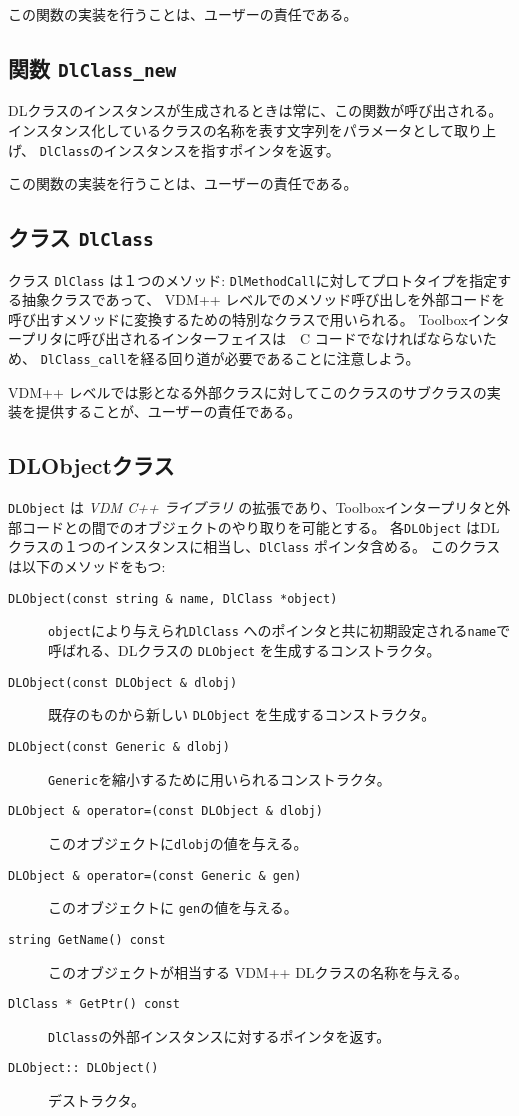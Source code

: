 \documentclass[\pformat,12pt]{jarticle}
\newcommand{\vdmcpplib}{\textit{VDM C++ ライブラリ}}
\begin{document}
この関数の実装を行うことは、ユーザーの責任である。

\subsection{関数 \texttt{DlClass\_new}}
 DLクラスのインスタンスが生成されるときは常に、この関数が呼び出される。
インスタンス化しているクラスの名称を表す文字列をパラメータとして取り上げ、 \texttt{DlClass}のインスタンスを指すポインタを返す。

この関数の実装を行うことは、ユーザーの責任である。

\subsection{クラス \texttt{DlClass}}
クラス \texttt{DlClass} は１つのメソッド: \texttt{DlMethodCall}に対してプロトタイプを指定する抽象クラスであって、 VDM++ レベルでのメソッド呼び出しを外部コードを呼び出すメソッドに変換するための特別なクラスで用いられる。
Toolboxインタープリタに呼び出されるインターフェイスは　C コードでなければならないため、 \texttt{DlClass\_call}を経る回り道が必要であることに注意しよう。

 VDM++ レベルでは影となる外部クラスに対してこのクラスのサブクラスの実装を提供することが、ユーザーの責任である。

\subsection{DLObjectクラス}
 \texttt{DLObject} は {\vdmcpplib} の拡張であり、Toolboxインタープリタと外部コードとの間でのオブジェクトのやり取りを可能とする。
各\texttt{DLObject} はDLクラスの１つのインスタンスに相当し、\texttt{DlClass} ポインタ含める。
このクラスは以下のメソッドをもつ:
\begin{description}
\item[\texttt{DLObject(const string \& name, DlClass *object)}]
\texttt{object}により与えられ\texttt{DlClass} へのポインタと共に初期設定される\texttt{name}で呼ばれる、DLクラスの \texttt{DLObject} を生成するコンストラクタ。
\item[\texttt{DLObject(const DLObject \& dlobj)}]
既存のものから新しい \texttt{DLObject} を生成するコンストラクタ。
\item[\texttt{DLObject(const Generic \& dlobj)}]
 \texttt{Generic}を縮小するために用いられるコンストラクタ。
\item[\texttt{DLObject \& operator=(const DLObject  \& dlobj)}]
このオブジェクトに\texttt{dlobj}の値を与える。
\item[\texttt{DLObject \& operator=(const Generic \& gen)}]
このオブジェクトに \texttt{gen}の値を与える。
\item[\texttt{string GetName() const}]
このオブジェクトが相当する VDM++ DLクラスの名称を与える。
\item[\texttt{DlClass * GetPtr() const}]
\texttt{DlClass}の外部インスタンスに対するポインタを返す。
\item[\texttt{DLObject::~DLObject()}]
デストラクタ。
\end{description}
\end{document}
